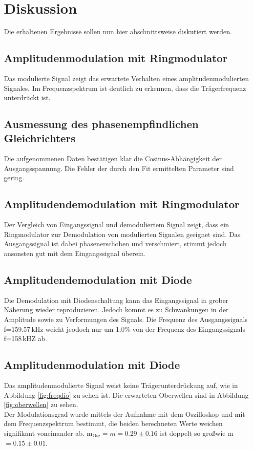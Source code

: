\documentclass[]{scrartcl}
\begin{document}
\section{Diskussion}
Die erhaltenen Ergebnisse sollen nun hier abschnittsweise diskutiert werden.

\subsection{Amplitudenmodulation mit Ringmodulator}
Das modulierte Signal zeigt das erwartete Verhalten eines amplitudenmodulierten Signales. Im Frequenzspektrum ist deutlich zu erkennen, dass die Trägerfrequenz unterdrückt ist.

\subsection{Ausmessung des phasenempfindlichen Gleichrichters}
Die aufgenommenen Daten bestätigen klar die Cosinus-Abhängigkeit der Ausgangsspannung. Die Fehler der durch den Fit ermittelten Parameter sind gering.

\subsection{Amplitudendemodulation mit Ringmodulator}
Der Vergleich von Eingangssignal und demoduliertem Signal zeigt, dass ein Ringmodulator zur Demodulation von modulierten Signalen geeignet sind. Das Ausgangssignal ist dabei phasenerschoben und verschmiert, stimmt jedoch ansonsten gut mit dem Eingangssignal überein. 

\subsection{Amplitudendemodulation mit Diode}
Die Demodulation mit Diodenschaltung kann das Eingangssignal in grober Näherung wieder reproduzieren. Jedoch kommt es zu Schwankungen in der Amplitude sowie zu Verformungen des Signals. Die Frequenz des Ausgangssignals f=159.57\,kHz weicht jeodoch nur um 1.0\% von der Frequenz des Eingangssignals f=158\,kHZ ab.

\subsection{Amplitudenmodulation mit Diode}
Das amplitudenmodulierte Signal weist keine Trägerunterdrückung auf, wie in Abbildung \ref{fig:freqdio} zu sehen ist. Die erwarteten Oberwellen sind in Abbildung \ref{fig:oberwellen} zu sehen. \\
Der Modulationsgrad wurde mittels der Aufnahme mit dem Oszilloskop und mit dem Frequenzspektrum bestimmt, die beiden berechneten Werte weichen signifikant voneinander ab. m$_{\text{Osz}}=m=0.29\pm0.16$ ist doppelt so gro\ss wie m$=0.15\pm 0.01$.
\end{document}

